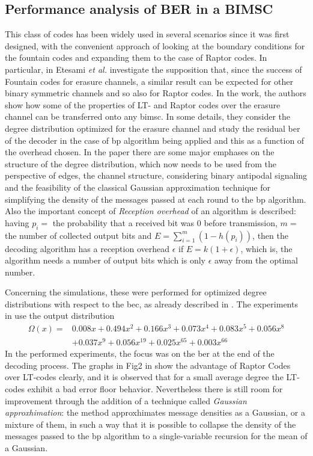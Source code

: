 \subsection{Performance analysis of BER in a BIMSC}
This class of codes has been widely used in several scenarios since it was first designed, with the convenient approach of looking at the boundary conditions for the fountain codes and expanding them to the case of Raptor codes. In particular, in \cite{Etesami2006} Etesami \textit{et al.} investigate the supposition that, since the success of Fountain codes for erasure channels, a similar result can be expected for other binary symmetric channels and so also for Raptor codes. In the work, the authors show how some of the properties of LT- and Raptor codes over the erasure channel can be transferred onto any \gls{bimsc}. In some details, they consider the degree distribution optimized for the erasure channel and study the residual \gls{ber} of the decoder in the case of \gls{bp} algorithm being applied and this as a function of the overhead chosen. In the paper there are some major emphases on the structure of the degree distribution, which now needs to be used from the perspective of edges, the channel structure, considering binary antipodal signaling and the feasibility of the classical Gaussian approximation technique for simplifying the density of the messages passed at each round to the \gls{bp} algorithm. Also the important concept of \textit{Reception overhead} of an algorithm is described: having $p_i = $ the probability that a received bit was $0$ before transmission, $m =$ the number of collected output bits and $E = \sum_{i=1}^m(1-h(p_i))$, then the decoding algorithm has a reception overhead $\epsilon$ if $E = k(1+\epsilon)$, which is, the algorithm needs a number of output bits which is only $\epsilon$ away from the optimal number.

Concerning the simulations, these were performed for optimized degree distributions with respect to the \gls{bec}, as already described in \cite{Shokrollahi2006}. The experiments in \cite{Etesami2006} use the output distribution
\begin{align}
  \Omega(x) =&0.008x + 0.494x^2 + 0.166x^3 + 0.073x^4 + 0.083x^5 + 0.056x^8\\
             &+ 0.037x^9 + 0.056x^{19} + 0.025x^{65} + 0.003x^{66}
\end{align}
In the performed experiments, the focus was on the \gls{ber} at the end of the decoding process. The graphs in Fig2 in \cite{Etesami2006} show the advantage of Raptor Codes over LT-codes clearly, and it is observed that for a small average degree the LT-codes exhibit a bad error floor behavior. Nevertheless there is still room for improvement through the addition of a technique called \textit{Gaussian approxhimation}: the method approxhimates message densities as a Gaussian, or a mixture of them, in such a way that it is possible to collapse the density of the messages passed to the \gls{bp} algorithm to a single-variable recursion for the mean of a Gaussian.
